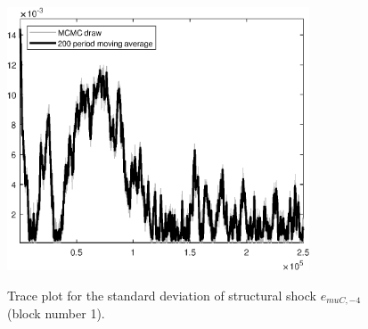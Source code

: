 \begin{figure}[H]
\centering
  \includegraphics[width=0.8\textwidth]{BRS_aggregate/graphs/TracePlot_SE_e_muC_news_blck_1}\\
    \caption{Trace plot for the standard deviation of structural shock ${e_{muC,-4}}$ (block number 1).}
\end{figure}
